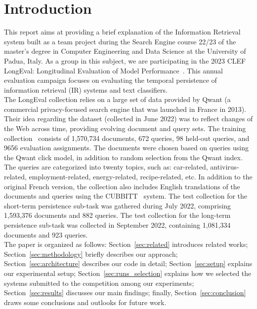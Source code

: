 \section{Introduction}
\label{sec:introduction}

This report aims at providing a brief explanation of the Information Retrieval system built as a team project during the
Search Engine course 22/23 of the master's degree in Computer Engineering and Data Science at the University of Padua,
Italy.
As a group in this subject, we are participating in the 2023 CLEF LongEval: Longitudinal Evaluation of Model
Performance~\cite{LongEval}.
This annual evaluation campaign focuses on evaluating the temporal persistence of information retrieval (IR) systems and
text classifiers.\\

The LongEval collection relies on a large set of data provided by Qwant (a commercial privacy-focused
search engine that was launched in France in 2013).
Their idea regarding the dataset (collected in June 2022) was to reflect changes of the Web across time, providing
evolving document and query sets.
The training collection~\cite{traindata} consists of 1,570,734 documents, 672 queries, 98 held-out queries, and 9656
evaluation assignments.
The documents were chosen based on queries using the Qwant click model, in addition to random selection from the Qwant
index.
The queries are categorized into twenty topics, such as: car-related, antivirus-related, employment-related,
energy-related, recipe-related, etc.
In addition to the original French version, the collection also includes English translations of the documents and
queries using the CUBBITT~\cite{CUBBITT} system.
The test collection for the short-term persistence sub-task was gathered during July 2022, comprising 1,593,376
documents and 882 queries.
The test collection for the long-term persistence sub-task was collected in September 2022, containing 1,081,334
documents and 923 queries.\\

The paper is organized as follows: Section~\ref{sec:related} introduces related works;
Section~\ref{sec:methodology} briefly describes our approach;
Section~\ref{sec:architecture} describes our code in detail;
Section~\ref{sec:setup} explains our experimental setup;
Section~\ref{sec:runs_selection} explains how we selected the systems submitted to the competition among our
experiments;
Section~\ref{sec:results} discusses our main findings;
finally, Section~\ref{sec:conclusion} draws some conclusions and outlooks for future work.